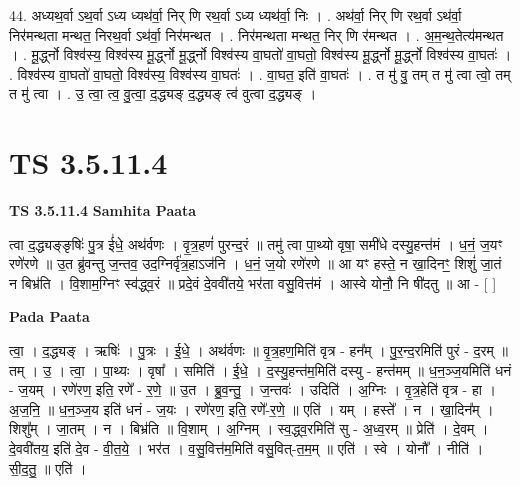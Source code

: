\documentclass[17pt]{extarticle}
\begin{document}
44. अध्यथ॒र्वा ऽथ॒र्वा ऽध्य ध्यथ॑र्वा॒ निर् णि रथ॒र्वा ऽध्य ध्यथ॑र्वा॒ निः । . अथ॑र्वा॒ निर् णि रथ॒र्वा ऽथ॑र्वा॒ निर॑मन्थता मन्थत॒ निरथ॒र्वा ऽथ॑र्वा॒ निर॑मन्थत । . निर॑मन्थता मन्थत॒ निर् णि र॑मन्थत । . अ॒म॒न्थ॒तेत्य॑मन्थत । . मू॒र्द्ध्नो विश्व॑स्य॒ विश्व॑स्य मू॒र्द्ध्नो मू॒र्द्ध्नो विश्व॑स्य वा॒घतो॑ वा॒घतो॒ विश्व॑स्य मू॒र्द्ध्नो मू॒र्द्ध्नो विश्व॑स्य वा॒घतः॑ । . विश्व॑स्य वा॒घतो॑ वा॒घतो॒ विश्व॑स्य॒ विश्व॑स्य वा॒घतः॑ । . वा॒घत॒ इति॑ वा॒घतः॑ । . त मु॑ वु॒ तम् त मु॑ त्वा त्वो॒ तम् त मु॑ त्वा । . उ॒ त्वा॒ त्व॒ वु॒त्वा॒ द॒द्ध्यङ् द॒द्ध्यङ् त्व॑ वुत्वा द॒द्ध्यङ् । \newline
\pagebreak
{}

\section{ TS 3.5.11.4 }

\textbf{TS 3.5.11.4 } \newline
\textbf{Samhita Paata} \newline

त्वा द॒द्ध्यङ्ङृषिः॑ पु॒त्र ई॑धे॒ अथ॑र्वणः । वृ॒त्र॒हणं॑ पुरन्द॒रं ॥ तमु॑ त्वा पा॒थ्यो वृषा॒ समी॑धे दस्यु॒हन्त॑मं । ध॒नं॒ ज॒यꣳ रणे॑रणे ॥ उ॒त ब्रु॑वन्तु ज॒न्तव॒ उद॒ग्निर्वृ॑त्र॒हाऽज॑नि । ध॒नं॒ ज॒यो रणे॑रणे ॥ आ यꣳ हस्ते॒ न खा॒दिनꣳ॒॒ शिशुं॑ जा॒तं न बिभ्र॑ति । वि॒शाम॒ग्निꣳ स्व॑द्ध्व॒रं ॥ प्रदे॒वं दे॒ववी॑तये॒ भर॑ता वसु॒वित्त॑मं । आस्वे योनौ॒ नि षी॑दतु ॥ आ - [  ] \newline

\textbf{Pada Paata} \newline

त्वा॒ । द॒द्ध्यङ् । ऋषिः॑ । पु॒त्रः । ई॒धे॒ । अथ॑र्वणः ॥ वृ॒त्र॒हण॒मिति॑ वृत्र - हन᳚म् । पु॒र॒न्द॒रमिति॑ पुरं - द॒रम् ॥ तम् । उ॒ । त्वा॒ । पा॒थ्यः । वृषा᳚ । समिति॑ । ई॒धे॒ । द॒स्यु॒हन्त॑म॒मिति॑ दस्यु - हन्त॑मम् ॥ ध॒न॒ञ्ज॒यमिति॑ धनं - ज॒यम् । रणे॑रण॒ इति॒ रणे᳚ - र॒णे॒ ॥ उ॒त । ब्रु॒व॒न्तु॒ । ज॒न्तवः॑ । उदिति॑ । अ॒ग्निः । वृ॒त्र॒हेति॑ वृत्र - हा । अ॒ज॒नि॒ ॥ ध॒न॒ञ्ज॒य इति॑ धनं - ज॒यः । रणे॑रण॒ इति॒ रणे᳚-र॒णे॒ ॥ एति॑ । यम् । हस्ते᳚ । न । खा॒दिन᳚म् । शिशु᳚म् । जा॒तम् । न । बिभ्र॑ति ॥ वि॒शाम् । अ॒ग्निम् । स्व॒द्ध्व॒रमिति॑ सु - अ॒ध्व॒रम् ॥ प्रेति॑ । दे॒वम् । दे॒ववी॑तय॒ इति॑ दे॒व - वी॒त॒ये॒ । भर॑त । व॒सु॒वित्त॑म॒मिति॑ वसु॒वित्-त॒म॒म् ॥ एति॑ । स्वे । योनौ᳚ । नीति॑ । सी॒द॒तु॒ ॥ एति॑ ।  \newline
\end{document}
